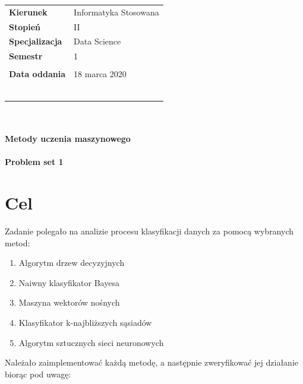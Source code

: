 \documentclass[a4paper,11pt]{article}
\begin{document}
\begin{titlepage}
\vspace{25px}

\begin{tabular}{ll}
\LARGE{\textbf{Kierunek}}& \LARGE{Informatyka Stosowana} \\
\LARGE{\textbf{Stopień}}& \LARGE{II} \\
\LARGE{\textbf{Specjalizacja}}& \LARGE{Data Science} \\
\LARGE{\textbf{Semestr}}& \LARGE{1} \\\\
\LARGE{\textbf{Data oddania}}& \LARGE{18 marca 2020} \\\\\\\\\\\\\\
\end{tabular}

\begin{center}
\textbf{\huge{\\~\\Metody uczenia maszynowego }}
\textbf{\Huge{\\~\\Problem set 1}}
\end{center}

\end{titlepage}

\setcounter{page}{2}
\tableofcontents
\newpage
{}

\section{Cel} \label{sec:cel}
Zadanie polegało na analizie procesu klasyfikacji danych za pomocą wybranych metod:

\begin{enumerate}
    \item Algorytm drzew decyzyjnych
    \item Naiwny klasyfikator Bayesa
    \item Maszyna wektorów nośnych
    \item Klasyfikator k-najbliższych sąsiadów
    \item Algorytm sztucznych sieci neuronowych
\end{enumerate}

Należało zaimplementować każdą metodę, a następnie zweryfikować jej działanie biorąc pod uwagę:
\end{document}

